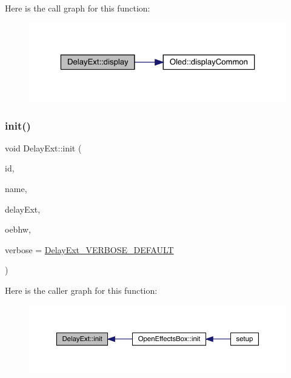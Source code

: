 Here is the call graph for this function\+:\nopagebreak
\begin{figure}[H]
\begin{center}
\leavevmode
\includegraphics[width=323pt]{class_delay_ext_a53d22982c98ab7cc1206744304ecd5a9_cgraph}
\end{center}
\end{figure}
\mbox{\label{class_delay_ext_ac1e47f4764e44f0a623687c7a2a95e6f}} 
\subsubsection{\texorpdfstring{init()}{init()}\hspace{0.1cm}{\footnotesize\ttfamily [1/2]}}
{\footnotesize\ttfamily void Delay\+Ext\+::init (\begin{DoxyParamCaption}\item[{int}]{id,  }\item[{char $\ast$}]{name,  }\item[{Audio\+Effect\+Delay\+External $\ast$}]{delay\+Ext,  }\item[{\mbox{\hyperlink{class_open_effects_box_h_w}{Open\+Effects\+Box\+HW}} $\ast$}]{oebhw,  }\item[{int}]{verbose = {\ttfamily \mbox{\hyperlink{_delay_ext_8h_a1c2b9cd031a3baecf2c7d96325dcb9b1}{Delay\+Ext\+\_\+\+V\+E\+R\+B\+O\+S\+E\+\_\+\+D\+E\+F\+A\+U\+LT}}} }\end{DoxyParamCaption})}

Here is the caller graph for this function\+:\nopagebreak
\begin{figure}[H]
\begin{center}
\leavevmode
\includegraphics[width=350pt]{class_delay_ext_ac1e47f4764e44f0a623687c7a2a95e6f_icgraph}
\end{center}
\end{figure}
\mbox{\label{class_delay_ext_aa7e84d74c1080b5473a7401a5042b305}} 
